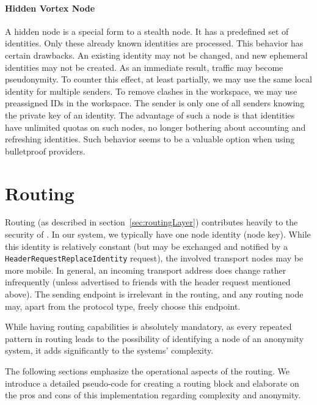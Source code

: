 \subsubsection{Hidden Vortex Node\label{sec:hiddenNode}}
A hidden node is a special form to a stealth node. It has a predefined set of identities. Only these already known identities are processed. This behavior has certain drawbacks. An existing identity may not be changed, and new ephemeral identities may not be created. As an immediate result, traffic may become pseudonymity. To counter this effect, at least partially, we may use the same local identity for multiple senders. To remove clashes in the workspace, we may use preassigned IDs in the workspace. The sender is only one of all senders knowing the private key of an identity. The advantage of such a node is that identities have unlimited quotas on such nodes, no longer bothering about accounting and refreshing identities. Such behavior seems to be a valuable option when using bulletproof providers.

\chapter{Routing}
Routing (as described in section~\ref{sec:routingLayer}) contributes heavily to the security of \MessageVortex. In our system, we typically have one node identity (node key). While this identity is relatively constant (but may be exchanged and notified by a \texttt{HeaderRequestReplaceIdentity} request), the involved transport nodes may be more mobile. In general, an incoming transport address does change rather infrequently (unless advertised to friends with the header request mentioned above). The sending endpoint is irrelevant in the routing, and any routing node may, apart from the protocol type, freely choose this endpoint. 

While having routing capabilities is absolutely mandatory, as every repeated pattern in routing leads to the possibility of identifying a node of an anonymity system, it adds significantly to the systems' complexity.

The following sections emphasize the operational aspects of the routing. We introduce a detailed pseudo-code for creating a routing block and elaborate on the pros and cons of this implementation regarding complexity and anonymity.

